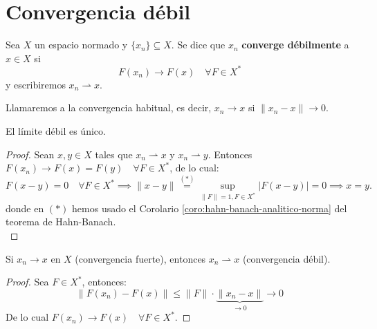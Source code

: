 \chapter{Convergencia débil}

\begin{definicion}
    Sea $X$ un espacio normado y $\{x_n\} \subseteq X$. Se dice que $x_n$ \textbf{converge débilmente} a $x \in X$ si
    \begin{equation*}
        F(x_n) \longrightarrow F(x) \quad \forall F \in X^*
    \end{equation*}
    y escribiremos $x_n \rightharpoonup x$. \\
\end{definicion}

\begin{observacion}
    Llamaremos  a la convergencia habitual, es decir, $x_n \longrightarrow x$ si \mbox{$\|x_n - x\| \longrightarrow 0$}.
\end{observacion}

\begin{prop}
    El límite débil es único.
\begin{proof}
    Sean $x, y \in X$ tales que $x_n \rightharpoonup x$ y $x_n \rightharpoonup y$. Entonces \mbox{$F(x_n) \longrightarrow F(x) = F(y) \quad \forall F \in X^*$}, de lo cual:
    \begin{equation*}
        F(x-y) = 0 \quad \forall F \in X^* \implies \|x-y\| \overset{(*)}{=} \sup_{\|F\|=1, F\in X^*} |F(x-y)| = 0 \implies x = y.
    \end{equation*}
    donde en $(*)$ hemos usado el Corolario \ref{coro:hahn-banach-analitico-norma} del teorema de Hahn-Banach. \\
\end{proof}
\end{prop}

\begin{prop}
    Si $x_n \longrightarrow x$ en $X$ (convergencia fuerte), entonces $x_n\rightharpoonup x$ (convergencia débil).

\begin{proof}
    Sea $F\in X^*$, entonces:
    \begin{equation*}
        \|F(x_n) - F(x)\| \le \|F\| \cdot \underbrace{\|x_n - x\|}_{\to 0} \longrightarrow 0
    \end{equation*}
    De lo cual $F(x_n) \longrightarrow F(x) \quad \forall F \in X^*$.
\end{proof}
\end{prop}

